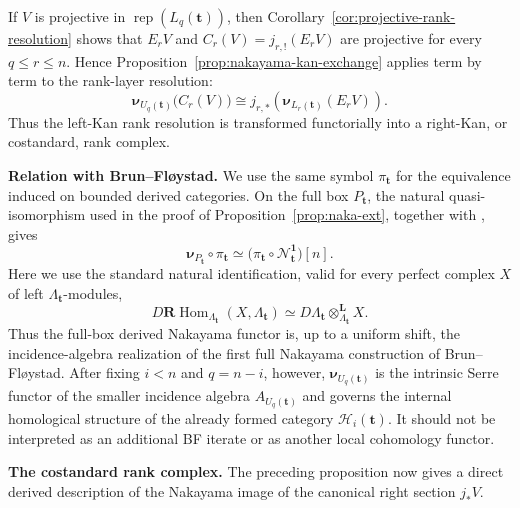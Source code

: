 \documentclass[12pt,reqno]{amsart}
\theoremstyle{definition}
\theoremstyle{remark}
\newcommand{\Rep}{\operatorname{rep}}
\newcommand{\Hom}{\operatorname{Hom}}
\begin{document}
If $V$ is projective in $\Rep(L_q(\mathbf t))$, then Corollary~\ref{cor:projective-rank-resolution}
shows that $E_rV$ and $C_r(V)=j_{r,!}(E_rV)$ are projective for every
$q\le r\le n$.  Hence Proposition~\ref{prop:nakayama-kan-exchange} applies
term by term to the rank-layer resolution:
\[
\boldsymbol\nu_{U_q(\mathbf t)}\bigl(C_r(V)\bigr)
\cong
j_{r,*}\!\left(\boldsymbol\nu_{L_r(\mathbf t)}(E_rV)\right).
\]
Thus the left-Kan rank resolution is transformed functorially into a
right-Kan, or costandard, rank complex.

\medskip\noindent\textbf{Relation with Brun--Fl\o ystad.}
We use the same symbol $\pi_{\mathbf t}$ for the equivalence induced on
bounded derived categories.  On the full box $P_{\mathbf t}$,
the natural quasi-isomorphism used in the proof of
Proposition~\ref{prop:naka-ext}, together with
\cite[Proposition~3.9]{BF}, gives
\begin{equation}\label{eq:BF-derived-nakayama-comparison}
\boldsymbol\nu_{P_{\mathbf t}}\circ\pi_{\mathbf t}
\simeq
\bigl(\pi_{\mathbf t}\circ\mathcal N_{\mathbf t}^{\mathbf1}\bigr)[n].
\end{equation}
Here we use the standard natural identification, valid for every perfect
complex $X$ of left $\Lambda_{\mathbf t}$-modules,
\[
D\mathbf R\!\Hom_{\Lambda_{\mathbf t}}(X,\Lambda_{\mathbf t})
\simeq
D\Lambda_{\mathbf t}\otimes_{\Lambda_{\mathbf t}}^{\mathbf L}X.
\]
Thus the full-box derived Nakayama functor is, up to a uniform shift, the
incidence-algebra realization of the first full Nakayama construction of
Brun--Fl\o ystad.  After fixing $i<n$ and $q=n-i$, however,
$\boldsymbol\nu_{U_q(\mathbf t)}$ is the intrinsic Serre functor of the
smaller incidence algebra $A_{U_q(\mathbf t)}$ and governs the internal
homological structure of the already formed category
$\mathcal H_i(\mathbf t)$.  It should not be interpreted as an additional BF
iterate or as another local cohomology functor.

\medskip\noindent\textbf{The costandard rank complex.}
The preceding proposition now gives a direct derived description of the
Nakayama image of the canonical right section $j_*V$.
\end{document}
